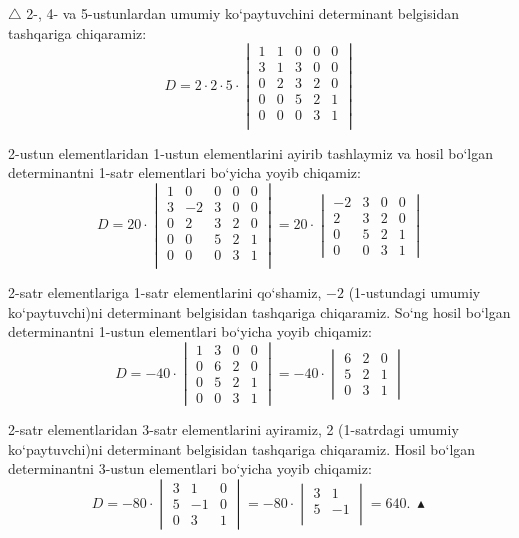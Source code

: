 \begin{enumerate}
$\triangle$ 2-, 4- va 5-ustunlardan umumiy ko`paytuvchini determinant belgisidan tashqariga chiqaramiz:
$$D=2\cdot2\cdot5\cdot\begin{vmatrix}
	1&1&0&0&0\\
	3&1&3&0&0\\
	0&2&3&2&0\\
	0&0&5&2&1\\
	0&0&0&3&1\\
\end{vmatrix}$$

2-ustun elementlaridan 1-ustun elementlarini ayirib tashlaymiz va hosil bo`lgan determinantni 1-satr elementlari bo`yicha yoyib chiqamiz:
$$D=20\cdot\begin{vmatrix}
	1&0&0&0&0\\
	3&-2&3&0&0\\
	0&2&3&2&0\\
	0&0&5&2&1\\
	0&0&0&3&1\\
\end{vmatrix}=20\cdot\begin{vmatrix}
-2&3&0&0\\
2&3&2&0\\
0&5&2&1\\
0&0&3&1
\end{vmatrix}$$

2-satr elementlariga 1-satr elementlarini qo`shamiz, $-2$ (1-ustundagi umumiy ko`paytuvchi)ni determinant belgisidan tashqariga chiqaramiz. So`ng hosil bo`lgan determinantni 1-ustun elementlari bo`yicha yoyib chiqamiz:
$$D=-40\cdot\begin{vmatrix}
	1&3&0&0\\
	0&6&2&0\\
	0&5&2&1\\
	0&0&3&1
\end{vmatrix}=-40\cdot\begin{vmatrix}
6&2&0\\
5&2&1\\
0&3&1
\end{vmatrix}$$

2-satr elementlaridan 3-satr elementlarini ayiramiz, 2 (1-satrdagi umumiy ko`paytuvchi)ni determinant belgisidan tashqariga chiqaramiz. Hosil bo`lgan determinantni 3-ustun elementlari bo`yicha yoyib chiqamiz:
$$D=-80\cdot\begin{vmatrix}
	3&1&0\\
	5&-1&0\\
	0&3&1
\end{vmatrix}=-80\cdot\begin{vmatrix}
3&1\\
5&-1\\
\end{vmatrix}=640.\ \blacktriangle$$


\end{enumerate}
